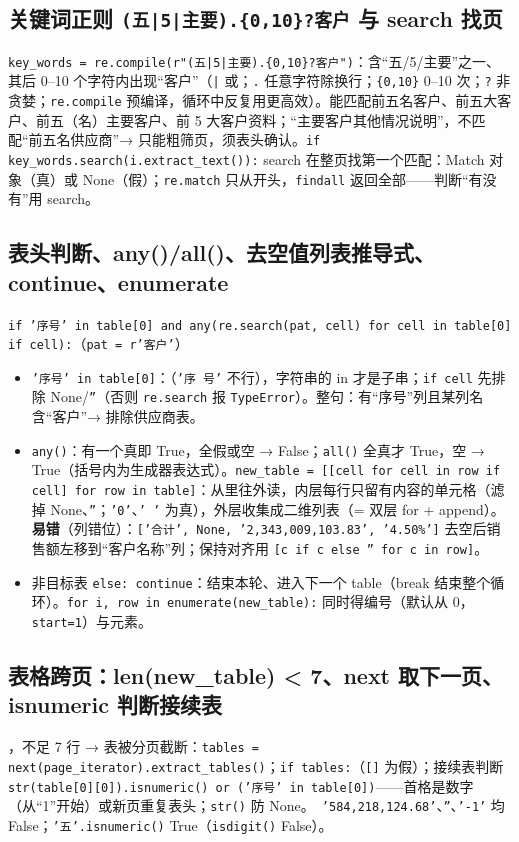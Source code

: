 \subsection{\texorpdfstring{关键词正则 \texttt{(五|5|主要).\{0,10\}?客户} 与 search 找页}{关键词正则 (五|5|主要).{0,10}?客户 与 search 找页}}
\texttt{key\_words = re.compile(r"(五|5|主要).\{0,10\}?客户")}：含“五/5/主要”之一、其后 0–10 个字符内出现“客户”（\texttt{|} 或；\texttt{.} 任意字符除换行；\texttt{\{0,10\}} 0–10 次；\texttt{?} 非贪婪；\texttt{re.compile} 预编译，循环中反复用更高效）。能匹配前五名客户、前五大客户、前五（名）主要客户、前 5 大客户资料；“主要客户其他情况说明”，不匹配“前五名供应商”→ 只能粗筛页，须表头确认。\texttt{if key\_words.search(i.extract\_text()):} search 在整页找第一个匹配：Match 对象（真）或 None（假）；\texttt{re.match} 只从开头，\texttt{findall} 返回全部——判断“有没有”用 search。

\subsection{表头判断、any()/all()、去空值列表推导式、continue、enumerate}
\texttt{if '序号' in table[0] and any(re.search(pat, cell) for cell in table[0] if cell):}（\texttt{pat = r'客户'}）
\begin{itemize}
\item \texttt{'序号' in table[0]}：（\texttt{'序 号'} 不行），字符串的 in 才是子串；\texttt{if cell} 先排除 None/\texttt{''}（否则 \texttt{re.search} 报 \texttt{TypeError}）。整句：有“序号”列且某列名含“客户”→ 排除供应商表。
\item \texttt{any()}：有一个真即 True，全假或空 → False；\texttt{all()} 全真才 True，空 → True（括号内为生成器表达式）。\texttt{new\_table = [[cell for cell in row if cell] for row in table]}：从里往外读，内层每行只留有内容的单元格（滤掉 None、\texttt{''}；\texttt{'0'}、\texttt{' '} 为真），外层收集成二维列表（= 双层 for + append）。\textbf{易错}（列错位）：\texttt{['合计', None, '2,343,009,103.83', '4.50\%']} 去空后销售额左移到“客户名称”列；保持对齐用 \texttt{[c if c else '' for c in row]}。
\item 非目标表 \texttt{else: continue}：结束本轮、进入下一个 table（break 结束整个循环）。\texttt{for i, row in enumerate(\allowbreak new\_table):} 同时得编号（默认从 0，\texttt{start=1}）与元素。
\end{itemize}

\subsection{表格跨页：len(new\_table) < 7、next 取下一页、isnumeric 判断接续表}
，不足 7 行 → 表被分页截断：\texttt{tables = next(page\_iterator).\allowbreak extract\_tables()}；\texttt{if tables:}（\texttt{[]} 为假）；接续表判断 \texttt{str(table[0][0]).isnumeric() or ('序号' in table[0])}——首格是数字（从“1”开始）或新页重复表头；\texttt{str()} 防 None。\tagext\ \texttt{'584,218,124.68'}、\texttt{''}、\texttt{'-1'} 均 False；\texttt{'五'.isnumeric()} True（\texttt{isdigit()} False）。

